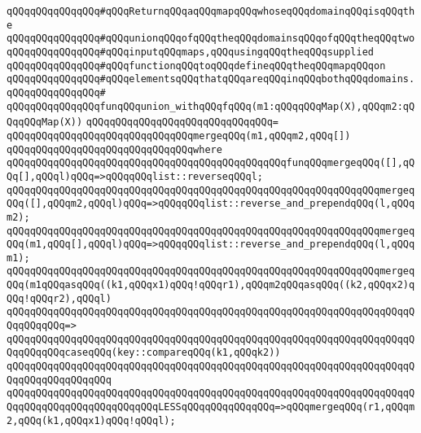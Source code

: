 \newline
\newline
\verb|qQQqqQQqqQQqqQQq#qQQqReturnqQQqaqQQqmapqQQqwhoseqQQqdomainqQQqisqQQqthe|\newline
\verb|qQQqqQQqqQQqqQQq#qQQqunionqQQqofqQQqtheqQQqdomainsqQQqofqQQqtheqQQqtwo|\newline
\verb|qQQqqQQqqQQqqQQq#qQQqinputqQQqmaps,qQQqusingqQQqtheqQQqsupplied|\newline
\verb|qQQqqQQqqQQqqQQq#qQQqfunctionqQQqtoqQQqdefineqQQqtheqQQqmapqQQqon|\newline
\verb|qQQqqQQqqQQqqQQq#qQQqelementsqQQqthatqQQqareqQQqinqQQqbothqQQqdomains.|\newline
\verb|qQQqqQQqqQQqqQQq#|\newline
\verb|qQQqqQQqqQQqqQQqfunqQQqunion_withqQQqfqQQq(m1:qQQqqQQqMap(X),qQQqm2:qQQqqQQqMap(X))|\newline
\verb|qQQqqQQqqQQqqQQqqQQqqQQqqQQqqQQq=|\newline
\verb|qQQqqQQqqQQqqQQqqQQqqQQqqQQqqQQqmergeqQQq(m1,qQQqm2,qQQq[])|\newline
\verb|qQQqqQQqqQQqqQQqqQQqqQQqqQQqqQQqwhere|\newline
\verb|qQQqqQQqqQQqqQQqqQQqqQQqqQQqqQQqqQQqqQQqqQQqqQQqfunqQQqmergeqQQq([],qQQq[],qQQql)qQQq=>qQQqqQQqlist::reverseqQQql;|\newline
\verb|qQQqqQQqqQQqqQQqqQQqqQQqqQQqqQQqqQQqqQQqqQQqqQQqqQQqqQQqqQQqqQQqmergeqQQq([],qQQqm2,qQQql)qQQq=>qQQqqQQqlist::reverse_and_prependqQQq(l,qQQqm2);|\newline
\verb|qQQqqQQqqQQqqQQqqQQqqQQqqQQqqQQqqQQqqQQqqQQqqQQqqQQqqQQqqQQqqQQqmergeqQQq(m1,qQQq[],qQQql)qQQq=>qQQqqQQqlist::reverse_and_prependqQQq(l,qQQqm1);|\newline
\newline
\verb|qQQqqQQqqQQqqQQqqQQqqQQqqQQqqQQqqQQqqQQqqQQqqQQqqQQqqQQqqQQqqQQqmergeqQQq(m1qQQqasqQQq((k1,qQQqx1)qQQq!qQQqr1),qQQqm2qQQqasqQQq((k2,qQQqx2)qQQq!qQQqr2),qQQql)|\newline
\verb|qQQqqQQqqQQqqQQqqQQqqQQqqQQqqQQqqQQqqQQqqQQqqQQqqQQqqQQqqQQqqQQqqQQqqQQqqQQqqQQq=>|\newline
\verb|qQQqqQQqqQQqqQQqqQQqqQQqqQQqqQQqqQQqqQQqqQQqqQQqqQQqqQQqqQQqqQQqqQQqqQQqqQQqqQQqcaseqQQq(key::compareqQQq(k1,qQQqk2))|\newline
\verb|qQQqqQQqqQQqqQQqqQQqqQQqqQQqqQQqqQQqqQQqqQQqqQQqqQQqqQQqqQQqqQQqqQQqqQQqqQQqqQQqqQQqqQQq|\newline
\verb|qQQqqQQqqQQqqQQqqQQqqQQqqQQqqQQqqQQqqQQqqQQqqQQqqQQqqQQqqQQqqQQqqQQqqQQqqQQqqQQqqQQqqQQqqQQqqQQqLESSqQQqqQQqqQQqqQQq=>qQQqmergeqQQq(r1,qQQqm2,qQQq(k1,qQQqx1)qQQq!qQQql);|\newline
